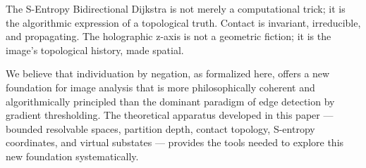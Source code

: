 \documentclass[twocolumn]{article}
\theoremstyle{plain}
\theoremstyle{definition}
\begin{document}
The S-Entropy Bidirectional Dijkstra is not merely a computational trick; it is
the algorithmic expression of a topological truth. Contact is invariant, irreducible,
and propagating. The holographic z-axis is not a geometric fiction; it is the
image's topological history, made spatial.

We believe that individuation by negation, as formalized here, offers a new
foundation for image analysis that is more philosophically coherent and
algorithmically principled than the dominant paradigm of edge detection by
gradient thresholding. The theoretical apparatus developed in this paper --- bounded
resolvable spaces, partition depth, contact topology, S-entropy coordinates,
and virtual substates --- provides the tools needed to explore this new foundation
systematically.

\printbibliography
\end{document}
